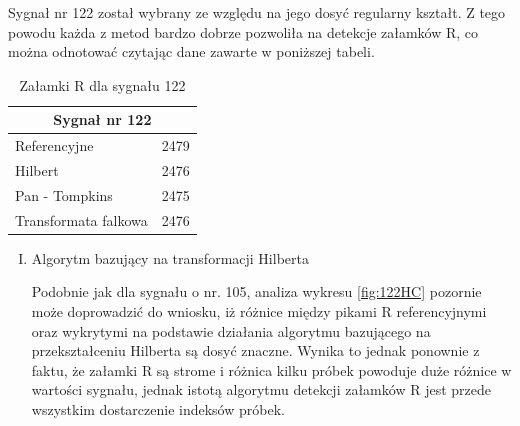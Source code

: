 \begin{itemize}
Sygnał nr 122 został wybrany ze względu na jego dosyć regularny kształt. Z tego powodu każda z metod bardzo dobrze pozwoliła na detekcje załamków R, co można odnotować czytając dane zawarte w poniższej tabeli.

\begin{table}[H]
\centering
\label{122peaks}
\caption{Załamki R dla sygnału 122}
\begin{tabular}{|l|c|}
\hline
\multicolumn{2}{|c|}{Sygnał nr 122}\\
\hline
Referencyjne & 2479 \\ \hline
Hilbert & 2476 \\ \hline
Pan - Tompkins & 2475 \\ \hline
Transformata falkowa & 2476 \\ \hline
\end{tabular}
\end{table}

\begin{enumerate}[I.]
\item Algorytm bazujący na transformacji Hilberta

Podobnie jak dla sygnału o nr. 105, analiza wykresu \ref{fig:122HC} pozornie może doprowadzić do wniosku, iż różnice między pikami R referencyjnymi oraz wykrytymi na podstawie działania algorytmu bazującego na przekształceniu Hilberta są dosyć znaczne. Wynika to jednak ponownie z faktu, że załamki R są strome i różnica kilku próbek powoduje duże różnice w wartości sygnału, jednak istotą algorytmu detekcji załamków R jest przede wszystkim dostarczenie indeksów próbek.


\end{enumerate}
\end{itemize}

